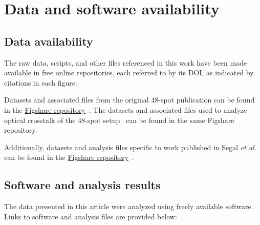 \chapter{Data and software availability}
\label{chpt:data_appendix}

\section{Data availability}
\label{sec:data_and_software}

The raw data, scripts, and other files referenced in this work have been made available in free online repositories, each referred to by its DOI, as indicated by citations in each figure. 

Datasets and associated files from the original 48-spot publication can be found in the \href{https://figshare.com/articles/dataset/48-spot_smFRET-PAX_measurements_of_dsDNA_oligos/5146096}{Figshare repository}~\cite{ingargiola_JCP_2018, figshare_48-spot_2017}.
The datasets and associated files used to analyze optical crosstalk of the 48-spot setup~\cite{ingargiola_NIMA_2018} can be found in the same Figshare repository.

Additionally, datasets and analysis files specific to work published in Segal \textit{et al.} can be found in the \href{https://figshare.com/s/df2d68693bc48d625a75}{Figshare repository}~\cite{figshare_repo_2019}.

\section{Software and analysis results}

The data presented in this article were analyzed using freely available software. 
Links to software and analysis files are provided below:

